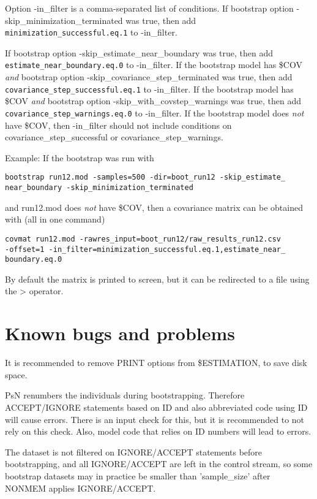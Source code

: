 Option -in\_filter is a comma-separated list of conditions.
If bootstrap option -skip\_minimization\_terminated was true, then add\\ 
\verb|minimization_successful.eq.1|
to -in\_filter. 

If bootstrap option -skip\_estimate\_near\_boundary was true, then add 
\verb|estimate_near_boundary.eq.0| 
to -in\_filter. 
If the bootstrap model has \$COV \emph{and} bootstrap option -skip\_covariance\_step\_terminated was true, then add
\verb|covariance_step_successful.eq.1| 
to -in\_filter. 
If the bootstrap model has \$COV \emph{and} bootstrap option -skip\_with\_covstep\_warnings was true, then add
\verb|covariance_step_warnings.eq.0| 
to -in\_filter. 
If the bootstrap model does \emph{not} have \$COV, then -in\_filter should not include conditions on covariance\_step\_successful or
covariance\_step\_warnings.

Example: If the bootstrap was run with
\begin{verbatim}
bootstrap run12.mod -samples=500 -dir=boot_run12 -skip_estimate_
near_boundary -skip_minimization_terminated
\end{verbatim}
and run12.mod does \emph{not} have \$COV, then a covariance matrix can be obtained with (all in one command)

\begin{verbatim}
covmat run12.mod -rawres_input=boot_run12/raw_results_run12.csv 
-offset=1 -in_filter=minimization_successful.eq.1,estimate_near_
boundary.eq.0
\end{verbatim}

By default the matrix is printed to screen, but it can be redirected to a file using the > operator.


\section{Known bugs and problems}

It is recommended to remove PRINT options from \$ESTIMATION, to save disk space.

PsN renumbers the individuals during bootstrapping. Therefore ACCEPT/IGNORE statements based on ID and also abbreviated code using ID will cause errors. 
There is an input check for this, but it is recommended to not rely on this check. Also, model code that relies on ID numbers will lead to errors.

The dataset is not filtered on IGNORE/ACCEPT statements before bootstrapping,
and all IGNORE/ACCEPT are left in the control stream, so some bootstrap
datasets may in practice be smaller than 'sample\_size' after NONMEM applies
IGNORE/ACCEPT. 

